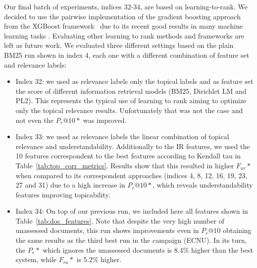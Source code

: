 Our final batch of experiments, indices 32-34, are based on learning-to-rank. We decided to use the pairwise implementation of the gradient boosting approach from the XGBoost framework~\cite{chen16} due to its recent good results in many machine learning tasks . Evaluating other learning to rank methods and frameworks are left as future work.
We evaluated three different settings based on the plain BM25 run shown in index 4, each one with a different combination of feature set and relevance labels:
\begin{itemize}
    \item Index 32: we used as relevance labels only the topical labels and as feature set the score of different information retrieval models (BM25, Dirichlet LM and PL2). This represents the typical use of learning to rank aiming to optimize only the topical relevance results. Unfortunately that was not the case and not even the $P_r@10*$ was improved.
    \item Index 33: we used as relevance labels the linear combination of topical relevance and understandability. Additionally to the IR features, we used the 10 features correspondent to the best features according to Kendall tau in Table~\ref{tab:top_corr_metrics}. Results show that this resulted in higher $F_{ur}*$ when compared to its correspondent approaches (indices 4, 8, 12, 16, 19, 23, 27 and 31) due to a high increase in $P_r@10*$, which reveals understandability features improving topicability.
    \item Index 34: On top of our previous run, we included here all features shown in Table~\ref{tab:doc_features}. Note that despite the very high number of unassessed documents, this run shows improvements even in $P_r@10$ obtaining the same results as the third best run in the campaign (ECNU). In its turn, the $P_{r}*$ which ignores the unassessed documents is 8.4\% higher than the best system, while $F_{ru}*$ is 5.2\% higher.
\end{itemize}






